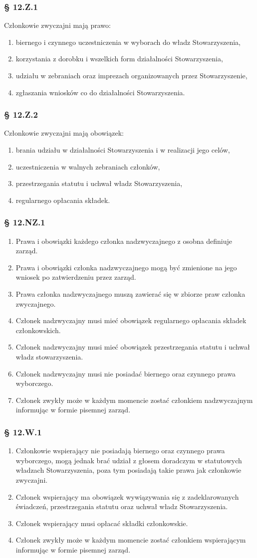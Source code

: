 \documentclass{article}
\newcommand{\myparagraph}[1]{\subsubsection*{#1}}
\begin{document}
\myparagraph{§ 12.Z.1}
Członkowie zwyczajni mają prawo:
\begin{enumerate}
\item
  biernego i czynnego uczestniczenia w wyborach do władz Stowarzyszenia,
\item
  korzystania z dorobku i wszelkich form działalności Stowarzyszenia,
\item
  udziału w zebraniach oraz imprezach organizowanych przez Stowarzyszenie,
\item
  zgłaszania wniosków co do działalności Stowarzyszenia.
\end{enumerate}

\myparagraph{§ 12.Z.2}
Członkowie zwyczajni mają obowiązek:
\begin{enumerate}
\item
  brania udziału w działalności Stowarzyszenia i w realizacji jego celów,
\item
  uczestniczenia w walnych zebraniach członków,
\item
  przestrzegania statutu i uchwał władz Stowarzyszenia,
\item
  regularnego opłacania składek.
\end{enumerate}

\myparagraph{§ 12.NZ.1}
\begin{enumerate}
\item
  Prawa i obowiązki każdego członka nadzwyczajnego z osobna definiuje zarząd.
\item
  Prawa i obowiązki członka nadzwyczajnego mogą być zmienione na jego wniosek po zatwierdzeniu przez zarząd.
\item
  Prawa członka nadzwyczajnego muszą zawierać się w zbiorze praw członka zwyczajnego.
\item
  Członek nadzwyczajny musi mieć obowiązek regularnego opłacania składek członkowskich.
\item
  Członek nadzwyczajny musi mieć obowiązek przestrzegania statutu i uchwał władz stowarzyszenia.
\item 
  Członek nadzwyczajny musi nie posiadać biernego oraz czynnego prawa wyborczego.
\item
  Członek zwykły może w każdym momencie zostać członkiem nadzwyczajnym informując w formie pisemnej zarząd.
\end{enumerate}

\myparagraph{§ 12.W.1}
\begin{enumerate}
\item
  Członkowie wspierający nie posiadają biernego oraz czynnego prawa wyborczego, mogą jednak brać udział z głosem doradczym w statutowych władzach Stowarzyszenia, poza tym posiadają takie prawa jak członkowie zwyczajni.
\item
  Członek wspierający ma obowiązek wywiązywania się z zadeklarowanych świadczeń, przestrzegania statutu oraz uchwał władz Stowarzyszenia.
\item
  Członek wspierający musi opłacać składki członkowskie.
\item
  Członek zwykły może w każdym momencie zostać członkiem wspierającym informując w formie pisemnej zarząd.
\end{enumerate}
\end{document}
